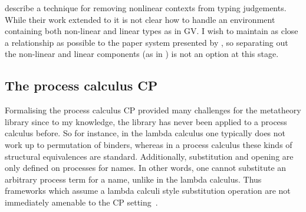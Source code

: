 \citeauthor{Park:2014:MMW} describe a technique for
removing nonlinear contexts from typing judgements. While their work extended
to \fpop it is not clear how to handle an environment containing both
non-linear and linear types as in GV. I wish to maintain as close a
relationship as possible to the paper system presented by
\citeauthor{Wadler:2014}, so separating out the non-linear and linear
components (as in \fpop) is not an option at this stage.

\begin{comment}
\section{Issues}

\begin{itemize}
\item What is required of a Metatheory library for linear type systems?
  Permutation reasoning? Weakening/Contraction for non-linear components?
\item Discuss the different approaches that were taken to maintain close
  correspondence with the paper presentation
\item Make sure to note that the paper leaves details (a lot of the ``cruft'')
  out of the proofs e.g. where weakening is applied in the typing derivations
\item Mention the use of Metatheory and its limitations when mechanising
  linear type systems like GV/CP
\end{itemize}
\end{comment}

\subsection{The process calculus CP}\label{sec:cp}

\begin{comment}
FIGURES

propositions

processes

typing judgements

equivalences and axiomatic cut

principal cut rules

commuting conversions
\end{comment}

Formalising the process calculus CP provided many challenges for the
metatheory library since to my knowledge, the library has never been applied
to a process calculus before. So for instance, in the lambda calculus one
typically does not work up to permutation of binders, whereas in a process
calculus these kinds of structural equivalences are standard. Additionally,
substitution and opening are only defined on processes for names. In other
words, one cannot substitute an arbitrary process term for a name, unlike in
the lambda calculus. Thus frameworks which assume a lambda calculi style
substitution operation are not immediately amenable to the CP
setting~\cite{Lee:2012}.

